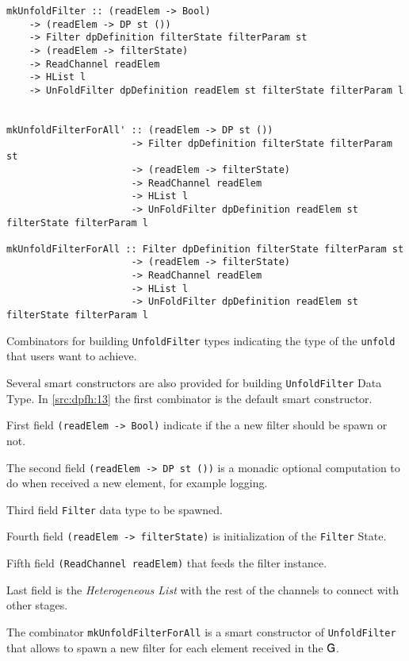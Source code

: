\begin{listing}[h!]
 \scriptsize{
  \begin{verbatim}
mkUnfoldFilter :: (readElem -> Bool) 
    -> (readElem -> DP st ()) 
    -> Filter dpDefinition filterState filterParam st 
    -> (readElem -> filterState)
    -> ReadChannel readElem
    -> HList l 
    -> UnFoldFilter dpDefinition readElem st filterState filterParam l


mkUnfoldFilterForAll' :: (readElem -> DP st ())
                      -> Filter dpDefinition filterState filterParam st
                      -> (readElem -> filterState)
                      -> ReadChannel readElem
                      -> HList l
                      -> UnFoldFilter dpDefinition readElem st filterState filterParam l

mkUnfoldFilterForAll :: Filter dpDefinition filterState filterParam st
                      -> (readElem -> filterState)
                      -> ReadChannel readElem
                      -> HList l
                      -> UnFoldFilter dpDefinition readElem st filterState filterParam l
   \end{verbatim}
   }
  \caption[{[\texttt{Stage.hs}] UnfoldFilter combinators}]{Combinators for building \texttt{UnfoldFilter} types indicating the type of the \texttt{unfold} that users want to achieve.}
  \label{src:dpfh:13}
\end{listing}

Several smart constructors are also provided for building \texttt{UnfoldFilter} Data Type.
In \autoref{src:dpfh:13} the first combinator is the default smart constructor.  \begin{inparaenum}[i\upshape)]
  \item First field \texttt{(readElem -> Bool)} indicate if the a new filter should be spawn or not.
  \item The second field \texttt{(readElem -> DP st ())} is a monadic optional computation to do when received a new element, for example logging.
  \item Third field \texttt{Filter} data type to be spawned.
  \item Fourth field \texttt{(readElem -> filterState)} is initialization of the \texttt{Filter} State.
  \item Fifth field \texttt{(ReadChannel readElem)} that feeds the filter instance.
  \item Last field is the \emph{Heterogeneous List} with the rest of the channels to connect with other stages.
\end{inparaenum}
The combinator \texttt{mkUnfoldFilterForAll} is a smart constructor of \texttt{UnfoldFilter} that allows to spawn a new filter for each element received in the $\mathsf{G}$.

